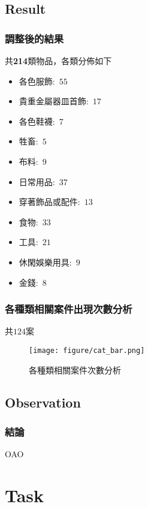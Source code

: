 \documentclass{beamer}
\begin{document}
\subsection{Result}
\begin{frame}
    \frametitle{調整後的結果}
    共\textbf{214}類物品，各類分佈如下
        \begin{itemize}
        \item 各色服飾:~$55$
        \item 貴重金屬器皿首飾:~$17$
        \item 各色鞋襪:~$7$
        \item 牲畜:~$5$
        \item 布料:~$9$
        \item 日常用品:~$37$
        \item 穿著飾品或配件:~$13$
        \item 食物:~$33$
        \item 工具:~$21$
        \item 休閑娛樂用具:~$9$
        \item 金錢:~$8$
        \end{itemize}
\end{frame}

\begin{frame}
\frametitle{各種類相關案件出現次數分析}
共$124$案
\begin{figure}[H]
    	\begin{center}
        	\texttt{[image: figure/cat\_bar.png]}
			\caption{各種類相關案件次數分析}
    	\end{center}
	\end{figure}
\end{frame}

\subsection{Observation}
\begin{frame}
\frametitle{結論}
OAO
\end{frame}


\section{Task}
\end{document}

